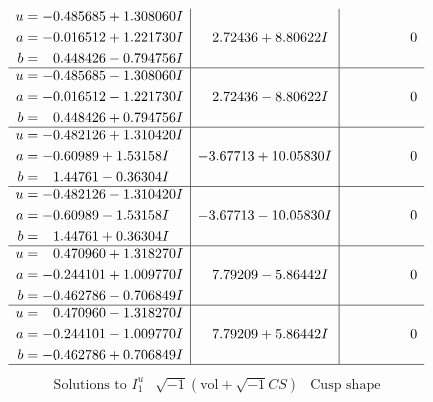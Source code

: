 \documentclass[1p]{elsarticle_modified}
\theoremstyle{definition}
\newcommand{\I}{\sqrt{-1}}
\begin{document}
$$\begin{array}{c|c|c}
\begin{aligned}
u &= -0.485685 + 1.308060 I \\
a &= -0.016512 + 1.221730 I \\
b &= \phantom{-}0.448426 - 0.794756 I\end{aligned}
 & \phantom{-}2.72436 + 8.80622 I & \phantom{-0.000000 } 0 \\ \hline\begin{aligned}
u &= -0.485685 - 1.308060 I \\
a &= -0.016512 - 1.221730 I \\
b &= \phantom{-}0.448426 + 0.794756 I\end{aligned}
 & \phantom{-}2.72436 - 8.80622 I & \phantom{-0.000000 } 0 \\ \hline\begin{aligned}
u &= -0.482126 + 1.310420 I \\
a &= -0.60989 + 1.53158 I \\
b &= \phantom{-}1.44761 - 0.36304 I\end{aligned}
 & -3.67713 + 10.05830 I & \phantom{-0.000000 } 0 \\ \hline\begin{aligned}
u &= -0.482126 - 1.310420 I \\
a &= -0.60989 - 1.53158 I \\
b &= \phantom{-}1.44761 + 0.36304 I\end{aligned}
 & -3.67713 - 10.05830 I & \phantom{-0.000000 } 0 \\ \hline\begin{aligned}
u &= \phantom{-}0.470960 + 1.318270 I \\
a &= -0.244101 + 1.009770 I \\
b &= -0.462786 - 0.706849 I\end{aligned}
 & \phantom{-}7.79209 - 5.86442 I & \phantom{-0.000000 } 0 \\ \hline\begin{aligned}
u &= \phantom{-}0.470960 - 1.318270 I \\
a &= -0.244101 - 1.009770 I \\
b &= -0.462786 + 0.706849 I\end{aligned}
 & \phantom{-}7.79209 + 5.86442 I & \phantom{-0.000000 } 0\\
 \hline 
 \end{array}$$\newpage$$\begin{array}{c|c|c}  
\text{Solutions to }I^u_{1}& \I (\text{vol} + \sqrt{-1}CS) & \text{Cusp shape}\\
 \hline 
\begin{aligned}

\end{aligned}
\end{array}$$
\end{document}
